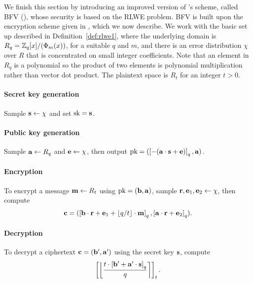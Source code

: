 \documentclass[../main.tex]{subfiles}
\begin{document}
We finish this section by introducing an improved version of \cite{brakerski2012fully}'s scheme, called BFV (\cite{fan2012somewhat}), whose security is based on the RLWE problem. 
BFV is built upon the encryption scheme given in \cite{lyubashevsky2010ideal}, which we now describe.
We work with the basic set up described in Definition~\ref{def:rlwe1}, where the underlying domain is $R_q = \mathbb{Z}_q[x]/(\Phi_m(x))$, for a suitable $q$ and $m$, and there is an error distribution $\chi$ over $R$ that is concentrated on small integer coefficients.
Note that an element in $R_q$ is a polynomial so the product of two elements is polynomial multiplication rather than vector dot product. 
The plaintext space is $R_t$ for an integer $t>0$.

\paragraph{Secret key generation} Sample $\mathbf{s} \leftarrow \chi$ and set $\text{sk}=\mathbf{s}$. 

\paragraph{Public key generation} Sample $\mathbf{a} \leftarrow R_q$ and $\mathbf{e} \leftarrow \chi$, then output $\text{pk}=(\left[{-(\mathbf{a} \cdot \mathbf{s} + \mathbf{e})}\right]_q,\mathbf{a})$.

\paragraph{Encryption} To encrypt a message $\mathbf{m} \leftarrow R_t$ using $\text{pk} = (\mathbf{b},\mathbf{a})$, sample $\mathbf{r}, \mathbf{e}_1, \mathbf{e}_2 \leftarrow \chi$, then compute 
\begin{align*}
    \mathbf{c}=(\left[{\mathbf{b} \cdot \mathbf{r} + \mathbf{e}_1 + \left\lfloor{q/t}\right\rfloor \cdot \mathbf{m}}\right]_q, \left[{\mathbf{a} \cdot \mathbf{r} + \mathbf{e}_2}\right]_q).
\end{align*}

\paragraph{Decryption} To decrypt a ciphertext $\mathbf{c} = (\mathbf{b}', \mathbf{a}')$ using the secret key $\mathbf{s}$, compute 
\begin{align*}
    \left[{\left\lfloor{\frac{t \cdot \left[{\mathbf{b}' + \mathbf{a}' \cdot \mathbf{s}}\right]_q}{q}}\right\rceil}\right]_t.
\end{align*}
\end{document}
